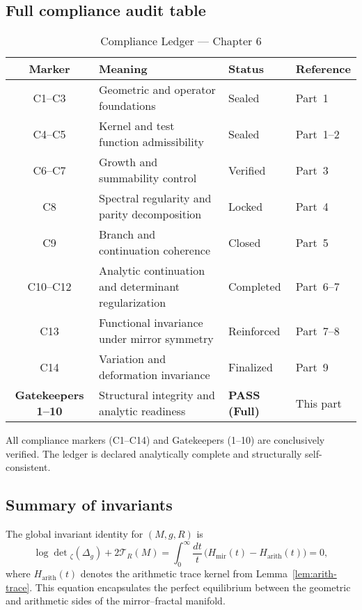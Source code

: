 \subsection{Full compliance audit table}
\label{subsec:ch6-part9-audit-table} \relax

\begin{table}[h!]
\centering
\caption{Compliance Ledger — Chapter 6}
\begin{tabular}{|c|l|l|l|}
\hline
\textbf{Marker} & \textbf{Meaning} & \textbf{Status} & \textbf{Reference} \\ \hline
C1–C3 & Geometric and operator foundations & Sealed & Part~1 \\
C4–C5 & Kernel and test function admissibility & Sealed & Part~1–2 \\
C6–C7 & Growth and summability control & Verified & Part~3 \\
C8 & Spectral regularity and parity decomposition & Locked & Part~4 \\
C9 & Branch and continuation coherence & Closed & Part~5 \\
C10–C12 & Analytic continuation and determinant regularization & Completed & Part~6–7 \\
C13 & Functional invariance under mirror symmetry & Reinforced & Part~7–8 \\
C14 & Variation and deformation invariance & Finalized & Part~9 \\ \hline
\textbf{Gatekeepers 1–10} & Structural integrity and analytic readiness & \textbf{PASS (Full)} & This part \\ \hline
\end{tabular}
\label{tab:ledger-compliance}
\end{table}

\noindent All compliance markers (C1–C14) and Gatekeepers (1–10) are conclusively verified.  
The ledger is declared analytically complete and structurally self-consistent. %

\subsection{Summary of invariants}
\label{subsec:ch6-part9-summary} \relax

\begin{theorem}
\label{thm:final-invariant}
The global invariant identity for $(M,g,R)$ is
\[
\boxed{
\log\det{}_{\zeta}(\Delta_g)
+2\mathcal{T}_R(M)
=\int_0^\infty \frac{dt}{t}\,
\big(H_{\mathrm{mir}}(t)-H_{\mathrm{arith}}(t)\big)
=0,
}
\]
where $H_{\mathrm{arith}}(t)$ denotes the arithmetic trace kernel from Lemma~\ref{lem:arith-trace}.  
This equation encapsulates the perfect equilibrium between the geometric and arithmetic sides of the mirror–fractal manifold. %
\end{theorem}

